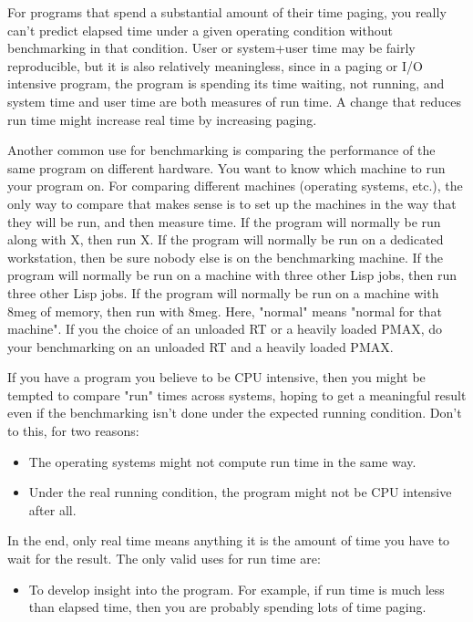 {For programs that spend a substantial amount of their time paging, you
really can't predict elapsed time under a given operating condition without
benchmarking in that condition.  User or system+user time may be fairly
reproducible, but it is also relatively meaningless, since in a paging or
I/O intensive program, the program is spending its time waiting, not
running, and system time and user time are both measures of run time.
A change that reduces run time might increase real time by increasing
paging.

Another common use for benchmarking is comparing the performance of the same
program on different hardware.  You want to know which machine to run your
program on.  For comparing different machines (operating systems, etc.), the
only way to compare that makes sense is to set up the machines in 
the way that they will  be run, and then measure  time.  If
the program will normally be run along with X, then run X.  If the program will
normally be run on a dedicated workstation, then be sure nobody else is on the
benchmarking machine.  If the program will normally be run on a machine with
three other Lisp jobs, then run three other Lisp jobs.  If the program will
normally be run on a machine with 8meg of memory, then run with 8meg.  Here,
"normal" means "normal for that machine".  If you the choice of an unloaded RT
or a heavily loaded PMAX, do your benchmarking on an unloaded RT and a heavily
loaded PMAX.

If you have a program you believe to be CPU intensive, then you might be
tempted to compare "run" times across systems, hoping to get a meaningful
result even if the benchmarking isn't done under the expected running
condition.  Don't to this, for two reasons:
\begin{itemize}

\item
The operating systems might not compute run time in the same way.

\item
Under the real running condition, the program might not be CPU
intensive after all.
\end{itemize}


In the end, only real time means anything \dash{} it is the amount of time you
have to wait for the result.  The only valid uses for run time are:
\begin{itemize}

\item
To develop insight into the program.  For example, if run time is much less
than elapsed time, then you are probably spending lots of time paging.


\end{itemize}}
